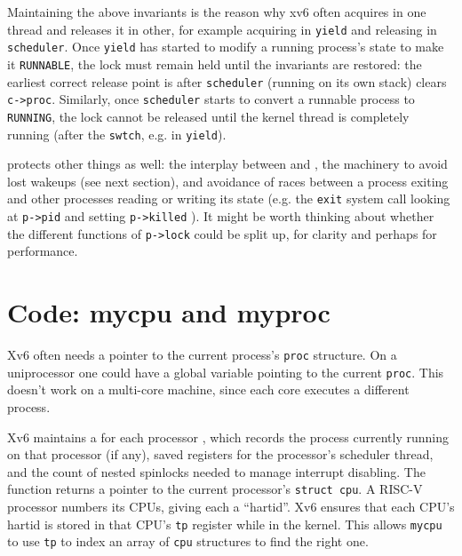 Maintaining the above invariants is the reason why xv6 often acquires 
in one thread and releases it in other,
for example acquiring in
\lstinline{yield}
and releasing in
\lstinline{scheduler}.
Once \lstinline{yield} has started to modify a running process's state
to make it
\lstinline{RUNNABLE},
the lock must remain held until the invariants are restored:
the earliest correct release point is after
\lstinline{scheduler}
(running on its own stack)
clears
\lstinline{c->proc}.
Similarly, once 
\lstinline{scheduler}
starts to convert a runnable process to
\lstinline{RUNNING},
the lock cannot be released until the kernel thread
is completely running (after the
\lstinline{swtch},
e.g. in
\lstinline{yield}).

protects other things as well:
the interplay between
and
,
the machinery to avoid lost wakeups (see next section),
and avoidance of races between a process exiting and other processes
reading or writing its state (e.g. the \lstinline{exit}
system call looking at \lstinline{p->pid} and
setting \lstinline{p->killed}
).
It might be worth thinking about whether the 
different functions of
\lstinline{p->lock}
could be split up, for clarity and perhaps
for performance.
\section{Code: mycpu and myproc}

Xv6 often needs a pointer to the current process's \lstinline{proc}
structure. On a uniprocessor one could have a global variable pointing
to the current \lstinline{proc}. This doesn't work on a multi-core
machine, since each core executes a different process.

Xv6 maintains a
for each processor
,
which records
the process currently running
on that processor (if any),
saved registers for the processor's scheduler thread,
and the count of nested spinlocks needed to manage
interrupt disabling.
The function
returns a pointer to the current processor's
\lstinline{struct cpu}.
A RISC-V processor numbers its CPUs, giving each
a ``hartid''.
Xv6 ensures that each CPU's hartid is stored in that CPU's \lstinline{tp} register
while in the kernel.
This allows
\lstinline{mycpu} to use \lstinline{tp} to index an array
of \lstinline{cpu} structures to find the right one.

